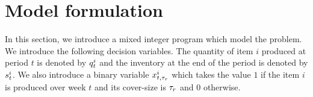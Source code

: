 

\section{Model formulation}
\label{sec:pdp-cover:model-formulation}

In this section, we introduce a mixed integer program which model the problem.
We introduce the following decision variables.
The quantity of item $i$ produced at period $t$ is denoted by $q_t^i$ and the inventory at the end of the period is denoted by $s_t^i$. We also introduce a binary variable $x_{t,\tau_r}^i$ which takes the value $1$ if the item $i$ is produced over week $t$ and its cover-size is $\tau_r$ and $0$ otherwise.



